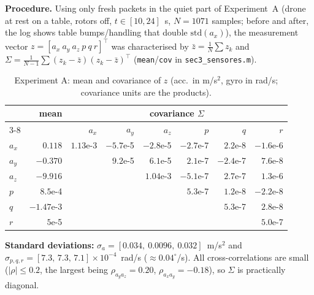 \textbf{Procedure.} Using only fresh packets in the quiet part of Experiment~A (drone at rest on a table, rotors off,
$t\in[10,24]$~s, $N=1071$ samples; before and after, the log shows table bumps/handling that double
$\mathrm{std}(a_x)$), the measurement vector $z=[a_x\ a_y\ a_z\ p\ q\ r]^\top$ was characterised by
$\bar z=\frac1N\sum z_k$ and $\Sigma=\frac1{N-1}\sum (z_k-\bar z)(z_k-\bar z)^\top$ (\texttt{mean}/\texttt{cov} in \texttt{sec3\_sensores.m}).

\begin{table}[H]\centering\scriptsize\setlength{\tabcolsep}{4pt}
\caption{Experiment A: mean and covariance of $z$ (acc.\ in m/s$^2$, gyro in rad/s; covariance units are the products).}\label{tab:statsA}
\begin{tabular}{l r rrr rrr}\toprule
 & mean & \multicolumn{6}{c}{covariance $\Sigma$}\\\cmidrule(lr){3-8}
 & & $a_x$ & $a_y$ & $a_z$ & $p$ & $q$ & $r$\\\midrule
$a_x$ & $\phantom{-}0.118$ & $1.13$e-3 & $-5.7$e-5 & $-2.8$e-5 & $-2.7$e-7 & $2.2$e-8 & $-1.6$e-6\\
$a_y$ & $-0.370$ & & $9.2$e-5 & $6.1$e-5 & $2.1$e-7 & $-2.4$e-7 & $7.6$e-8\\
$a_z$ & $-9.916$ & & & $1.04$e-3 & $-5.1$e-7 & $2.7$e-7 & $1.3$e-6\\
$p$ & $\phantom{-}8.5$e-4 & & & & $5.3$e-7 & $1.2$e-8 & $-2.2$e-8\\
$q$ & $-1.47$e-3 & & & & & $5.3$e-7 & $2.8$e-8\\
$r$ & $\phantom{-}5$e-5 & & & & & & $5.0$e-7\\\bottomrule
\end{tabular}
\end{table}

\textbf{Standard deviations:} $\sigma_{a}=[0.034,\ 0.0096,\ 0.032]$~m/s$^2$ and
$\sigma_{p,q,r}=[7.3,\,7.3,\,7.1]\times10^{-4}$~rad/s ($\approx0.04^\circ$/s). All cross-correlations are small
($|\rho|\le0.2$, the largest being $\rho_{a_y a_z}=0.20$, $\rho_{a_xa_y}=-0.18$), so $\Sigma$ is practically diagonal.

